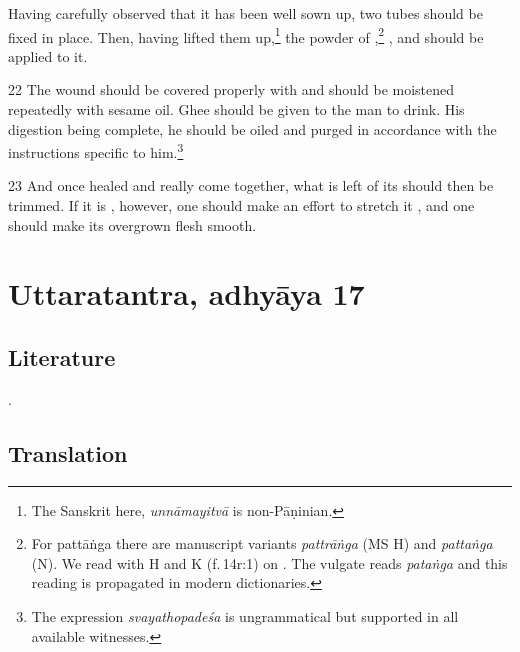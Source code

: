 \documentclass[12pt]{article}
\let\se\saneng  %
\begin{document}
\begin{translation}
        Having carefully observed that it has been well sown up,
        two tubes should be fixed in place.  Then, having lifted them up,\footnote{The 
        Sanskrit here, \emph{unnāmayitvā} is  non-Pāṇinian.}
        the powder of
        ,\footnote{For {pattāṅga} there are manuscript variants 
\emph{pattrāṅga} (MS H) and \emph{pattaṅga}    (N).  We read with H and K 
(f.\,14r:1) on \citet[1.14.36]{vulgate}. The vulgate reads \emph{pataṅga} 
and this reading is propagated in modern dictionaries.}
        ,
        and
        should be applied to it.
        
       \item[22] 
     The wound should be covered properly with  and should be
     moistened repeatedly with sesame oil.  Ghee should be given to the man to
     drink.  His digestion being complete, he should be oiled and purged in
     accordance with the instructions specific to him.\footnote{The expression 
     \emph{svayathopadeśa} is ungrammatical but supported in all available 
     witnesses.}   
     
     \item[23] %
And once healed and really come together, what is left of its \se{vadhra}{flesh}
should then be trimmed. If it is  \se{hīna}{reduced}, however, one should make an
effort to stretch it , and one should make its overgrown flesh smooth.
     
     
    \end{translation}    



\section{Uttaratantra, adhyāya 17}

\subsection{Literature}

\cites[IA, 305--306]{meul-hist}{wujad-2019,desh-2000,desh-1999,leff-2020}.

\subsection{Translation}
\end{document}
